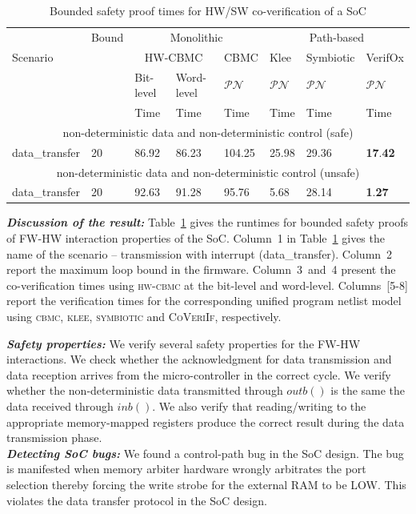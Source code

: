 \documentclass[sigconf]{acmart}
\newcommand{\tool}[1]{\textsc{#1}\xspace}
\newcommand{\cbmcv}{\tool{cbmc}}
\newcommand{\hwcbmcv}{\tool{hw-cbmc}}
\newcommand{\verifox}{\tool{CoVeriIf}}
\newcommand{\klee}{\tool{klee}}
\begin{document}
\begin{table}
\begin{center}
{
\begin{scriptsize}
\begin{tabular}{|l|l|l|l|l|l|l|l|}
\hline
  & Bound & \multicolumn{3}{c|}{Monolithic} & \multicolumn{3}{c|}{Path-based} \\ 
\cline{3-8}
 Scenario &  & \multicolumn{2}{c|}{HW-CBMC} & CBMC & Klee & Symbiotic & VerifOx \\ 
\cline{3-8}
      &       &  Bit-level & Word-level & $\mathcal{PN}$ & $\mathcal{PN}$ & $\mathcal{PN}$ & $\mathcal{PN}$ \\
\cline{1-8}
      &       &   Time     &   Time      & Time  &  Time & Time & Time \\
\cline{1-8}      
\multicolumn{8}{|c|}{non-deterministic data and non-deterministic control (safe)} \\ \hline
data\_transfer & 20 & 86.92 & 86.23 & 104.25 & 25.98 & 29.36 &
\textbf{17}.\textbf{42} \\ 
\hline
\multicolumn{8}{|c|}{non-deterministic data and non-deterministic control
(unsafe)} \\ \hline
data\_transfer & 20 & 92.63 & 91.28 & 95.76 & 5.68 & 28.14 &
\textbf{1}.\textbf{27} \\ 
\hline
\end{tabular}
\end{scriptsize}
}
\end{center}
\vspace{-1.3mm}
\caption{Bounded safety proof times for HW/SW co-verification of a SoC 
\label{table:SoC}}
\end{table}

\textbf{\emph{Discussion of the result:}}
%
Table~\ref{table:SoC} gives the runtimes for bounded safety proofs of 
FW-HW interaction properties of the SoC.  Column~1 in
Table~\ref{table:SoC} gives the name of the scenario -- transmission with
interrupt (data\_transfer).  Column~2 report the maximum loop bound in the
firmware.  Column~3~and~4 present the co-verification times using \hwcbmcv
at the bit-level and word-level.  Columns~[5-8] report the
verification times for the corresponding unified program netlist model using
\cbmcv, \klee, \textsc{symbiotic} and \verifox, respectively.  

\textbf{\emph{Safety properties:}}
%
We verify several safety properties for the FW-HW interactions.  We check
whether the acknowledgment for data transmission and data reception arrives
from the micro-controller in the correct cycle.  We verify whether the
non-deterministic data transmitted through $outb()$ is the same
the data received through $inb()$.  We also verify that
reading/writing to the appropriate memory-mapped registers produce the
correct result during the data transmission phase.\\ \textbf{\emph{Detecting
SoC bugs:}} We found a control-path bug in the SoC design.  The bug is
manifested when memory arbiter hardware wrongly arbitrates the port
selection thereby forcing the write strobe for the external RAM to be LOW. 
This violates the data transfer protocol in the SoC design.
\end{document}
